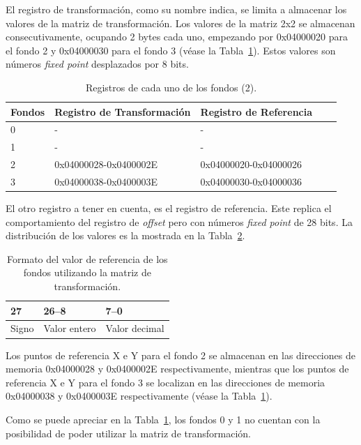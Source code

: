 El registro de transformación, como su nombre indica, se limita a almacenar los valores de la matriz de transformación. Los valores de la matriz 2x2 se almacenan consecutivamente, ocupando 2 bytes cada uno, empezando por 0x04000020 para el fondo 2 y 0x04000030 para el fondo 3 (véase la Tabla~\ref{tab:fondo_reg_2}). Estos valores son números \textit{fixed point} desplazados por 8 bits.

\begin{table}[h]
	\centering
	\begin{tabular}{| l | l | l | l | l |}
		\hline
		\textbf{Fondos} & \textbf{Registro de Transformación} & \textbf{Registro de Referencia}  \\ \hline
		0 &  - & -  \\ \hline
		1 & - & -  \\ \hline
		2 & 0x04000028-0x0400002E & 0x04000020-0x04000026  \\ \hline
		3 & 0x04000038-0x0400003E & 0x04000030-0x04000036  \\ \hline
	\end{tabular}
	\caption{Registros de cada uno de los fondos (2).}\label{tab:fondo_reg_2}
\end{table}

El otro registro a tener en cuenta, es el registro de referencia. Este replica el comportamiento del registro de \textit{offset} pero con números \textit{fixed point} de 28 bits. La distribución de los valores es la mostrada en la Tabla~\ref{tab:dist_fixed_fondo}.

\begin{table}[h]
	\centering
	\begin{tabular}{| l | l | l |}
		\hline
		27 & 26--8 & 7--0  \\ \hline
		Signo & Valor entero & Valor decimal  \\ \hline
	\end{tabular}
	\caption{Formato del valor de referencia de los fondos utilizando la matriz de transformación.}\label{tab:dist_fixed_fondo}
\end{table}

Los puntos de referencia X e Y para el fondo 2 se almacenan en las direcciones de memoria 0x04000028 y 0x0400002E respectivamente, mientras que los puntos de referencia X e Y para el fondo 3 se localizan en las direcciones de memoria 0x04000038 y 0x0400003E respectivamente (véase la Tabla~\ref{tab:fondo_reg_2}).

Como se puede apreciar en la Tabla~\ref{tab:fondo_reg_2}, los fondos 0 y 1 no cuentan con la posibilidad de poder utilizar la matriz de transformación.

